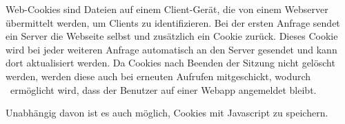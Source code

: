 \label{sec:cookies}

Web-Cookies sind Dateien auf einem Client-Gerät, die von einem Webserver übermittelt werden, um Clients zu identifizieren. 
Bei der ersten Anfrage sendet ein Server die Webseite selbst und zusätzlich ein Cookie zurück. 
Dieses Cookie wird bei jeder weiteren Anfrage automatisch an den Server gesendet und kann dort aktualisiert werden. 
Da Cookies nach Beenden der Sitzung nicht gelöscht werden, werden diese auch bei erneuten Aufrufen mitgeschickt, wodurch \zb\ ermöglicht wird, dass der Benutzer auf einer Webapp angemeldet bleibt. 

Unabhängig davon ist es auch möglich, Cookies mit Javascript zu speichern. %
\cite{wikiCookies}
